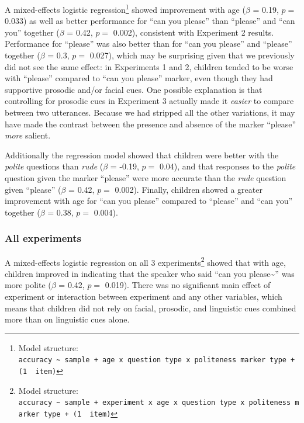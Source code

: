 \documentclass[10pt, letterpaper]{article}
\begin{document}
A mixed-effects logistic regression\footnote{Model structure:
  \texttt{accuracy\ \textasciitilde{}\ sample\ +\ age\ x\ question\ type\ x\ politeness\ marker\ type\ +\ (1\ \textbar{}\ item)}}
showed improvement with age (\(\beta\) = 0.19, \(p =\) 0.033) as well as
better performance for ``can you please'' than ``please'' and ``can
you'' together (\(\beta\) = 0.42, \(p =\) 0.002), consistent with
Experiment 2 results. Performance for ``please'' was also better than
for ``can you please'' and ``please'' together (\(\beta\) = 0.3, \(p =\)
0.027), which may be surprising given that we previously did not see the
same effect: in Experiments 1 and 2, children tended to be worse with
``please'' compared to ``can you please'' marker, even though they had
supportive prosodic and/or facial cues. One possible explanation is that
controlling for prosodic cues in Experiment 3 actually made it
\emph{easier} to compare between two utterances. Because we had stripped
all the other variations, it may have made the contrast between the
presence and absence of the marker ``please'' \emph{more} salient.

Additionally the regression model showed that children were better with
the \emph{polite} questions than \emph{rude} (\(\beta\) = -0.19, \(p =\)
0.04), and that responses to the \emph{polite} question given the marker
``please'' were more accurate than the \emph{rude} question given
``please'' (\(\beta\) = 0.42, \(p =\) 0.002). Finally, children showed a
greater improvement with age for ``can you please'' compared to
``please'' and ``can you'' together (\(\beta\) = 0.38, \(p =\) 0.004).

\subsubsection{All experiments}\label{all-experiments}

A mixed-effects logistic regression on all 3 experiments\footnote{Model
  structure:
  \texttt{accuracy\ \textasciitilde{}\ sample\ +\ experiment\ x\ age\ x\ question\ type\ x\ politeness\ marker\ type\ +\ (1\ \textbar{}\ item)}}
showed that with age, children improved in indicating that the speaker
who said ``can you please\textasciitilde{}'' was more polite (\(\beta\)
= 0.42, \(p =\) 0.019). There was no significant main effect of
experiment or interaction between experiment and any other variables,
which means that children did not rely on facial, prosodic, and
linguistic cues combined more than on linguistic cues alone.
\end{document}
